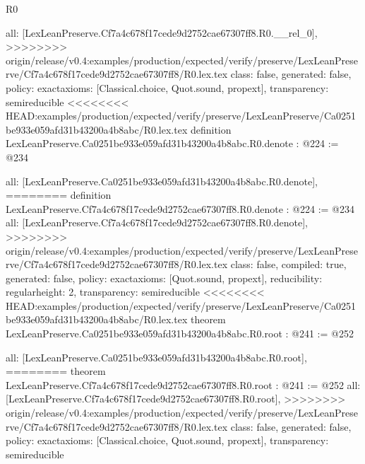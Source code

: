 \begin{lexlean}{R0}
\begin{coremodule}
{{{{  all: [LexLeanPreserve.Cf7a4c678f17cede9d2752cae67307ff8.R0.__rel_0],
>>>>>>>> origin/release/v0.4:examples/production/expected/verify/preserve/LexLeanPreserve/Cf7a4c678f17cede9d2752cae67307ff8/R0.lex.tex
  class: false,
  generated: false,
  policy: exact{axioms: [Classical.choice, Quot.sound, propext]},
  transparency: semireducible
}
<<<<<<<< HEAD:examples/production/expected/verify/preserve/LexLeanPreserve/Ca0251be933e059afd31b43200a4b8abc/R0.lex.tex
definition LexLeanPreserve.Ca0251be933e059afd31b43200a4b8abc.R0.denote : @224 := @234 {
  all: [LexLeanPreserve.Ca0251be933e059afd31b43200a4b8abc.R0.denote],
========
definition LexLeanPreserve.Cf7a4c678f17cede9d2752cae67307ff8.R0.denote : @224 := @234 {
  all: [LexLeanPreserve.Cf7a4c678f17cede9d2752cae67307ff8.R0.denote],
>>>>>>>> origin/release/v0.4:examples/production/expected/verify/preserve/LexLeanPreserve/Cf7a4c678f17cede9d2752cae67307ff8/R0.lex.tex
  class: false,
  compiled: true,
  generated: false,
  policy: exact{axioms: [Quot.sound, propext]},
  reducibility: regular{height: 2},
  transparency: semireducible
}
<<<<<<<< HEAD:examples/production/expected/verify/preserve/LexLeanPreserve/Ca0251be933e059afd31b43200a4b8abc/R0.lex.tex
theorem LexLeanPreserve.Ca0251be933e059afd31b43200a4b8abc.R0.root : @241 := @252 {
  all: [LexLeanPreserve.Ca0251be933e059afd31b43200a4b8abc.R0.root],
========
theorem LexLeanPreserve.Cf7a4c678f17cede9d2752cae67307ff8.R0.root : @241 := @252 {
  all: [LexLeanPreserve.Cf7a4c678f17cede9d2752cae67307ff8.R0.root],
>>>>>>>> origin/release/v0.4:examples/production/expected/verify/preserve/LexLeanPreserve/Cf7a4c678f17cede9d2752cae67307ff8/R0.lex.tex
  class: false,
  generated: false,
  policy: exact{axioms: [Classical.choice, Quot.sound, propext]},
  transparency: semireducible
}

}}}}}
\end{coremodule}
\end{lexlean}
